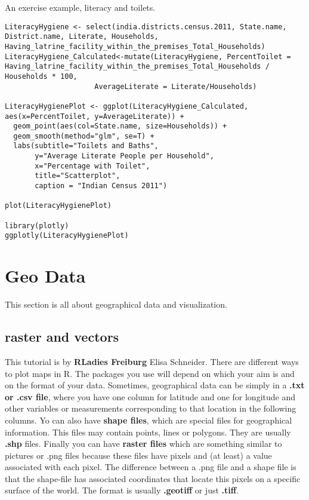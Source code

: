 \documentclass[
]{book}
\theoremstyle{definition}
\theoremstyle{definition}
\theoremstyle{definition}
\theoremstyle{definition}
\theoremstyle{remark}
\begin{document}
An exercise example, literacy and toilets.

\begin{verbatim}
LiteracyHygiene <- select(india.districts.census.2011, State.name, District.name, Literate, Households, Having_latrine_facility_within_the_premises_Total_Households)
LiteracyHygiene_Calculated<-mutate(LiteracyHygiene, PercentToilet = Having_latrine_facility_within_the_premises_Total_Households / Households * 100,
                     AverageLiterate = Literate/Households)

LiteracyHygienePlot <- ggplot(LiteracyHygiene_Calculated, aes(x=PercentToilet, y=AverageLiterate)) + 
  geom_point(aes(col=State.name, size=Households)) + 
  geom_smooth(method="glm", se=T) + 
  labs(subtitle="Toilets and Baths", 
       y="Average Literate People per Household", 
       x="Percentage with Toilet", 
       title="Scatterplot", 
       caption = "Indian Census 2011")

plot(LiteracyHygienePlot)

library(plotly)
ggplotly(LiteracyHygienePlot)
\end{verbatim}

\hypertarget{geo-data}{%
\chapter{Geo Data}\label{geo-data}}

This section is all about geographical data and visualization.

\hypertarget{raster-and-vectors}{%
\section{raster and vectors}\label{raster-and-vectors}}

This tutorial is by \textbf{RLadies Freiburg} Elisa Schneider.
There are different ways to plot maps in R. The packages you use will depend on which your aim is and on the format of your data. Sometimes, geographical data can be simply in a \textbf{.txt or .csv file}, where you have one column for latitude and one for longitude and other variables or measurements corresponding to that location in the following columns. Yo can also have \textbf{shape files}, which are special files for geographical information. This files may contain points, lines or polygons. They are usually \textbf{.shp} files. Finally you can have \textbf{raster files} which are something similar to pictures or .png files because these files have pixels and (at least) a value associated with each pixel. The difference between a .png file and a shape file is that the shape-file has associated coordinates that locate this pixels on a specific surface of the world. The format is usually \textbf{.geotiff} or just \textbf{.tiff}.
\end{document}
